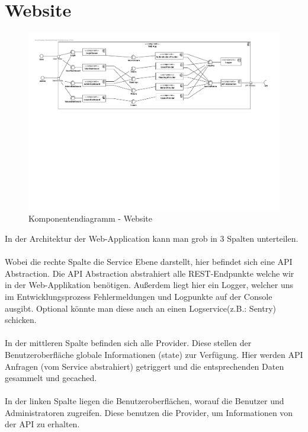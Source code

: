 
\section{Website}

\begin{figure}[h]
	\includegraphics[scale = 0.45]{./img/Diagrams/Website-Components} 	
	\caption{Komponentendiagramm - Website} 
\end{figure}

In der Architektur der Web-Application kann man grob in 3 Spalten unterteilen. 
\\ \\
Wobei die rechte Spalte die Service Ebene darstellt, hier befindet sich eine API Abstraction. Die API Abstraction abstrahiert alle REST-Endpunkte welche wir in der Web-Applikation benötigen. Außerdem liegt hier ein Logger, welcher uns im Entwicklungsprozess Fehlermeldungen und Logpunkte auf der Console ausgibt. Optional könnte man diese auch an einen Logservice(z.B.: Sentry) schicken.
\\ \\
In der mittleren Spalte befinden sich alle Provider. Diese stellen der Benutzeroberfläche globale Informationen (state) zur Verfügung. Hier werden API Anfragen (vom Service abstrahiert) getriggert und die entsprechenden Daten gesammelt und gecached.
\\ \\
In der linken Spalte liegen die Benutzeroberflächen, worauf die Benutzer und Administratoren zugreifen. Diese benutzen die Provider, um Informationen von der API zu erhalten.

\newpage

